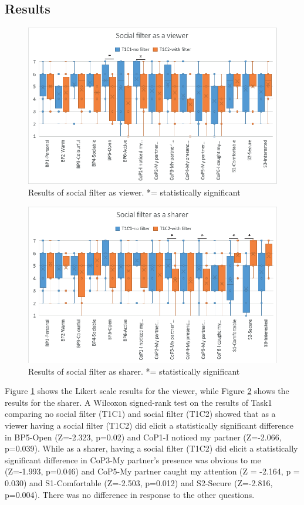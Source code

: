 \subsection{Results}

\begin{figure}
\begin{center}
\includegraphics[width=0.8\linewidth]{images/frontier18/images-03.eps}
\caption{Results of social filter as viewer. *= statistically significant}\label{fig:frontier18:result-filter-viewer}
\end{center}
\end{figure}

\begin{figure}
\begin{center}
\includegraphics[width=0.8\linewidth]{images/frontier18/images-04.eps}
\caption{Results of social filter as sharer. *= statistically significant}\label{fig:frontier18:result-filter-sharer}
\end{center}
\end{figure}

Figure \ref{fig:frontier18:result-filter-viewer} shows the Likert scale results for the viewer, while Figure \ref{fig:frontier18:result-filter-sharer} shows the results for the sharer. A Wilcoxon signed-rank test on the results of Task1 comparing no social filter (T1C1) and social filter (T1C2) showed that as a viewer having a social filter (T1C2) did elicit a statistically significant difference in BP5-Open (Z=-2.323, p=0.02) and CoP1-I noticed my partner (Z=-2.066, p=0.039). While as a sharer, having a social filter (T1C2) did elicit a statistically significant difference in CoP3-My partner's presence was obvious to me (Z=-1.993, p=0.046) and CoP5-My partner caught my attention (Z = -2.164, p = 0.030) and S1-Comfortable (Z=-2.503, p=0.012) and S2-Secure (Z=-2.816, p=0.004). There was no difference in response to the other questions.

